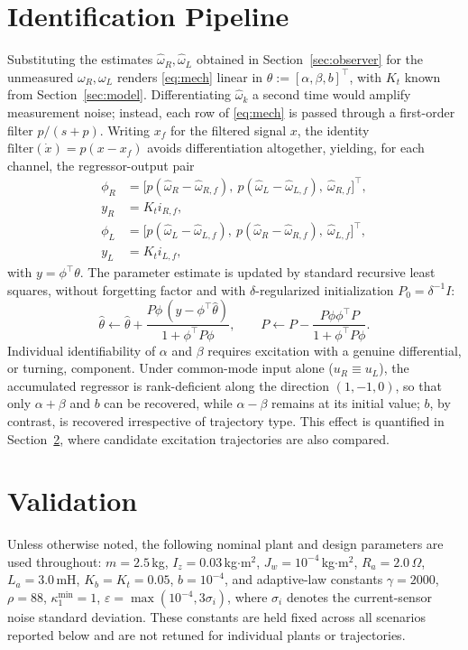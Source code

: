 \documentclass[letterpaper, 10 pt, conference]{ieeeconf}
\begin{document}
\section{Identification Pipeline}
\label{sec:rls}
Substituting the estimates $\hat\omega_R,\hat\omega_L$ obtained in Section~\ref{sec:observer} for the unmeasured $\omega_R,\omega_L$ renders \eqref{eq:mech} linear in $\theta:=[\alpha,\beta,b]^\top$, with $K_t$ known from Section~\ref{sec:model}. Differentiating $\hat\omega_k$ a second time would amplify measurement noise; instead, each row of \eqref{eq:mech} is passed through a first-order filter $p/(s+p)$. Writing $x_f$ for the filtered signal $x$, the identity $\mathrm{filter}(\dot x)=p(x-x_f)$ avoids differentiation altogether, yielding, for each channel, the regressor-output pair
\begin{align}
\phi_R &= \big[p(\hat\omega_R-\hat\omega_{R,f}),\ p(\hat\omega_L-\hat\omega_{L,f}),\ \hat\omega_{R,f}\big]^\top, \nonumber\\
y_R&=K_ti_{R,f}, \nonumber\\
\phi_L &= \big[p(\hat\omega_L-\hat\omega_{L,f}),\ p(\hat\omega_R-\hat\omega_{R,f}),\ \hat\omega_{L,f}\big]^\top, \nonumber\\
y_L&=K_ti_{L,f}, \nonumber
\end{align}
with $y=\phi^\top\theta$. The parameter estimate is updated by standard recursive least squares, without forgetting factor and with $\delta$-regularized initialization $P_0=\delta^{-1}I$:
\begin{equation}
\hat\theta \leftarrow \hat\theta + \frac{P\phi\,(y-\phi^\top\hat\theta)}{1+\phi^\top P\phi}, \qquad P \leftarrow P - \frac{P\phi\phi^\top P}{1+\phi^\top P\phi}.
\label{eq:rls}
\end{equation}
Individual identifiability of $\alpha$ and $\beta$ requires excitation with a genuine differential, or turning, component. Under common-mode input alone ($u_R\equiv u_L$), the accumulated regressor is rank-deficient along the direction $(1,-1,0)$, so that only $\alpha+\beta$ and $b$ can be recovered, while $\alpha-\beta$ remains at its initial value; $b$, by contrast, is recovered irrespective of trajectory type. This effect is quantified in Section~\ref{sec:validation}, where candidate excitation trajectories are also compared.

\section{Validation}
\label{sec:validation}
Unless otherwise noted, the following nominal plant and design parameters are used throughout: $m=2.5$\,kg, $I_z=0.03$\,kg$\cdot$m$^2$, $J_w{=}10^{-4}$\,kg$\cdot$m$^2$, $R_a{=}2.0\,\Omega$, $L_a{=}3.0$\,mH, $K_b{=}K_t{=}0.05$, $b{=}10^{-4}$, and adaptive-law constants $\gamma{=}2000$, $\rho{=}88$, $\kappa_1^{\min}{=}1$, $\varepsilon{=}\max(10^{-4},3\sigma_i)$, where $\sigma_i$ denotes the current-sensor noise standard deviation. These constants are held fixed across all scenarios reported below and are not retuned for individual plants or trajectories.
\end{document}
